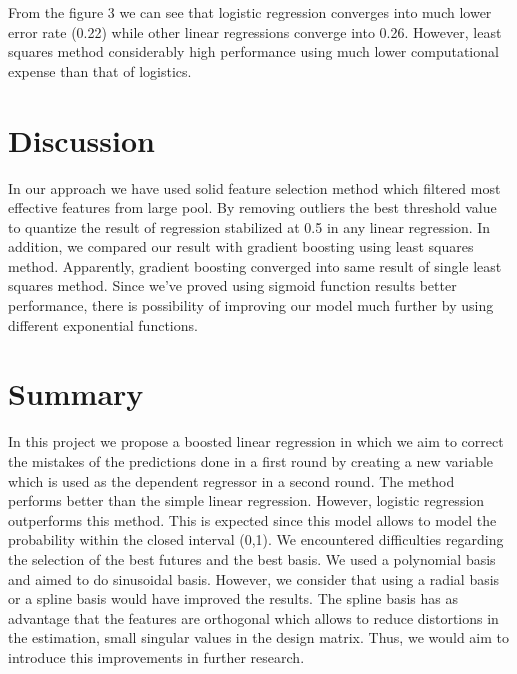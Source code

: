 \documentclass[10pt,conference,compsocconf]{IEEEtran}
\begin{document}
From the figure 3 we can see that logistic regression converges into much lower error rate (0.22) while other linear regressions converge into 0.26. However, least squares method considerably high performance using much lower computational expense than that of logistics.
\section{Discussion}
\label{S1}
  In our approach we have used solid feature selection method which filtered most effective features from large pool. By removing outliers the best threshold value to quantize the result of regression stabilized at 0.5 in any linear regression. In addition, we compared our result with gradient boosting using least squares method. Apparently, gradient boosting converged into same result of single least squares method.
  Since we've proved using sigmoid function results better performance, there is possibility of improving our model much further by using different exponential functions.
\section{Summary}
\label{S1}
In this project we propose a boosted linear regression in which we aim to correct the mistakes of the predictions done in a first round by creating a new variable which is used as the dependent regressor in a second round. The method performs better than the simple linear regression. However, logistic regression outperforms this method. This is expected since this model allows to model the probability within the closed interval (0,1). 
We encountered difficulties regarding the selection of the best futures and the best basis. We used a polynomial basis and aimed to do sinusoidal basis. However, we consider that using a radial basis or a spline basis would have improved the results. The spline basis has as advantage that the features are orthogonal which allows to reduce distortions in the estimation, small singular values in the design matrix. Thus, we would aim to introduce this improvements in further research. 
\end{document}
